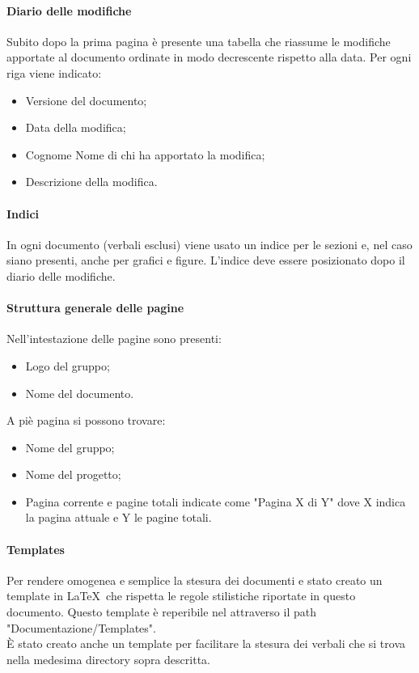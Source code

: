 \documentclass[../NormeDiProgetto.tex]{subfiles}
\begin{document}
				\paragraph{Diario delle modifiche\\}
					Subito dopo la prima pagina è presente una tabella che riassume le modifiche
					apportate al documento ordinate in modo decrescente rispetto alla data.
					Per ogni riga viene indicato:
					\begin{itemize}
						\item Versione del documento;
						\item Data della modifica;
						\item Cognome Nome di chi ha apportato la modifica;
						\item Descrizione della modifica.
					\end{itemize}
				\paragraph{Indici\\}
					In ogni documento (verbali esclusi) viene usato un indice per le sezioni e, nel caso siano
					presenti, anche per grafici e figure. L'indice deve essere posizionato dopo il diario
					delle modifiche.
				\paragraph{Struttura generale delle pagine\\}
					Nell'intestazione delle pagine sono presenti:
					\begin{itemize}
						\item Logo del gruppo;
						\item Nome del documento.
					\end{itemize}
					A piè pagina si possono trovare:    
					\begin{itemize}
						\item Nome del gruppo;
						\item Nome del progetto;
						\item Pagina corrente e pagine totali indicate come "Pagina X di Y" dove
						X indica la pagina attuale e Y le pagine totali.
					\end{itemize}
				\paragraph{Templates\\}
					Per rendere omogenea e semplice la stesura dei documenti e stato creato un
					template in \LaTeX\ che rispetta le regole stilistiche riportate in
					questo documento.
					Questo template è reperibile nel   attraverso il path
					"Documentazione/Templates".\\
					È stato creato anche un template per facilitare la stesura dei verbali che si
					trova nella medesima directory sopra descritta.
\end{document}
